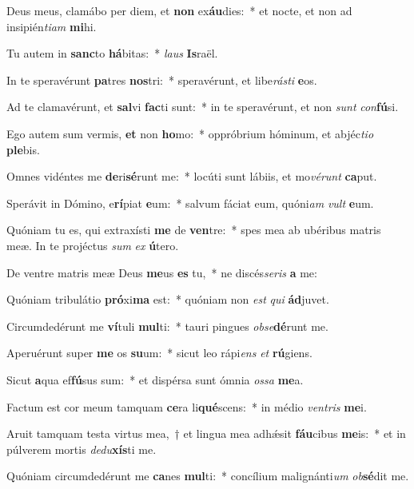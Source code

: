 \item Deus meus, clamábo per diem, et \textbf{non} ex\textbf{áu}dies:~* et nocte, et non ad insipién\textit{ti}\textit{am} \textbf{mi}hi.
\item Tu autem in \textbf{sanc}to \textbf{há}bitas:~* \textit{laus} \textbf{Is}raël.
\item In te speravérunt \textbf{pa}tres \textbf{nos}tri:~* speravérunt, et libe\textit{rás}\textit{ti} \textbf{e}os.
\item Ad te clamavérunt, et \textbf{sal}vi \textbf{fac}ti sunt:~* in te speravérunt, et non \textit{sunt} \textit{con}\textbf{fú}si.
\item Ego autem sum vermis, \textbf{et} non \textbf{ho}mo:~* oppróbrium hóminum, et abjéc\textit{ti}\textit{o} \textbf{ple}bis.
\item Omnes vidéntes me \textbf{de}ri\textbf{sé}runt me:~* locúti sunt lábiis, et mo\textit{vé}\textit{runt} \textbf{ca}put.
\item Sperávit in Dómino, e\textbf{rí}piat \textbf{e}um:~* salvum fáciat eum, quóni\textit{am} \textit{vult} \textbf{e}um.
\item Quóniam tu es, qui extraxísti \textbf{me} de \textbf{ven}tre:~* spes mea ab ubéribus matris meæ. In te projéctus \textit{sum} \textit{ex} \textbf{ú}tero.
\item De ventre matris meæ Deus \textbf{me}us \textbf{es} tu,~* ne discés\textit{se}\textit{ris} \textbf{a} me:
\item Quóniam tribulátio \textbf{pró}xi\textbf{ma} est:~* quóniam non \textit{est} \textit{qui} \textbf{ád}juvet.
\item Circumdedérunt me \textbf{ví}tuli \textbf{mul}ti:~* tauri pingues \textit{ob}\textit{se}\textbf{dé}runt me.
\item Aperuérunt super \textbf{me} os \textbf{su}um:~* sicut leo rápi\textit{ens} \textit{et} \textbf{rú}giens.
\item Sicut \textbf{a}qua ef\textbf{fú}sus sum:~* et dispérsa sunt ómnia \textit{os}\textit{sa} \textbf{me}a.
\item Factum est cor meum tamquam \textbf{ce}ra li\textbf{qué}scens:~* in médio \textit{ven}\textit{tris} \textbf{me}i.
\item Aruit tamquam testa virtus mea,~† et lingua mea adhǽsit \textbf{fáu}cibus \textbf{me}is:~* et in púlverem mortis \textit{de}\textit{du}\textbf{xís}ti me.
\item Quóniam circumdedérunt me \textbf{ca}nes \textbf{mul}ti:~* concílium malignánti\textit{um} \textit{ob}\textbf{sé}dit me.
